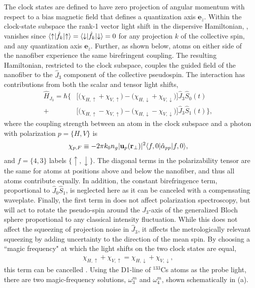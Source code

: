 \documentclass[preprint, aps,pra,onecolumn]{revtex4-1} %
\newcommand{\jz}{\hat{J}_3}
\newcommand{\magic}[1]{\omega_{#1}^m}
\begin{document}
The clock states are defined to have zero projection of angular momentum with respect to a bias magnetic field that defines a quantization axis $\mathbf{e}_{\tilde{z}}$.  
Within the clock-state subspace the rank-1 vector light shift in the dispersive Hamiltonian, , vanishes since $\langle{\uparrow}\rvert\hat{f}_k \lvert{\uparrow}\rangle =\langle{\downarrow}\rvert\hat{f}_k \lvert{\downarrow}\rangle = 0$ for any projection $k$ of the collective spin, and any quantization axis $\mathbf{e}_{\tilde{z}}$. 
Further, as shown below, atoms on either side of the nanofiber experience the same birefringent coupling. 
The resulting Hamiltonian, restricted to the clock subspace, couples the guided field of the nanofiber to the $\hat{J}_3$ component of the collective pseudospin. The interaction has contributions from both the scalar and tensor light shifts,
	\begin{align} \label{Eq::ClockHamiltonian}
		\hat{H}_{J_3} = \hbar \Big\{ & \big[ \big( \chi_{H,\uparrow} +\chi_{V,\uparrow} \big) - \big( \chi_{H,\downarrow} + \chi_{V,\downarrow}\big) \big] \jz \hat{S}_0(t) \\
		+ & \big[  \big( \chi_{H, \uparrow} - \chi_{V,\uparrow} \big) - \big(\chi_{H,\downarrow} - \chi_{V,\downarrow} \big) \big]  \jz \hat{S}_1(t) \Big\}, \nonumber
	\end{align}
where the coupling strength between an atom in the clock subspace and a photon with polarization $p = \{H,V\}$ is
	\begin{equation} \label{Eq::ClockCouplingStrength}
		\chi_{p,F} \equiv - 2\pi k_0 n_g  | \mathbf{u}_p(\mathbf{r}_\perp)|^2 \langle{f,0}\rvert\hat{\alpha}_{pp}  \lvert{f,0}\rangle,
	\end{equation}
and $f = \{4,3\}$ labels $\{\uparrow,\downarrow\}$.  
The diagonal terms in the polarizability tensor are the same for atoms at positions above and below the nanofiber, and thus all atoms contribute equally. 
In addition, the constant birefringence term, proportional to $ \hat{J}_0\hat{S}_1 $, is neglected here as it can be canceled with a compensating waveplate. 
Finally, the first term in  does not affect polarization spectroscopy, but will act to rotate the pseudo-spin around the $J_3$-axis of the generalized Bloch sphere proportional to any classical intensity fluctuation.
While this does not affect the squeezing of projection noise in $\hat{J}_3$, it affects the metrologically relevant squeezing by adding uncertainty to the direction of the mean spin.  By choosing a ``magic frequency" at which the light shifts on the two clock states are equal, 
	\begin{align} \label{Eq::MagicWavelengthCondition}
		\chi_{H,\uparrow} +\chi_{V,\uparrow}  = \chi_{H,\downarrow} + \chi_{V,\downarrow},
	\end{align}
this term can be cancelled \cite{chaudhury_continuous_2006}.
Using the D1-line of $^{133}$Cs atoms as the probe light, there are two magic-frequency solutions, $ \magic{3} $ and $\magic{4}$, shown schematically in (a).  
\end{document}
